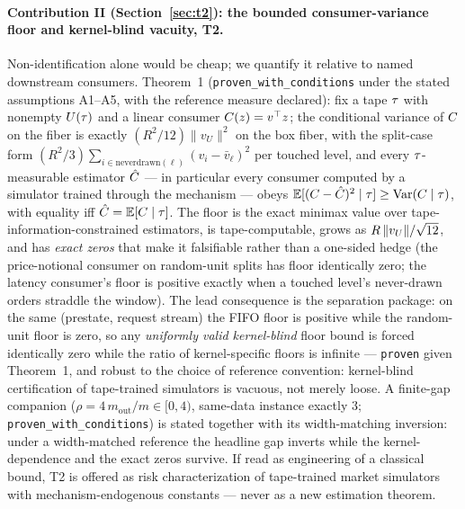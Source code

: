 \paragraph{Contribution II (Section~\ref{sec:t2}): the bounded
consumer-variance floor and kernel-blind vacuity, T2.}
Non-identification alone would be cheap; we quantify it relative to named
downstream consumers. Theorem~1 (\texttt{proven\_with\_conditions} under the
stated assumptions A1--A5, with the reference measure declared): fix a tape
$\tau$ with nonempty $U(\tau)$ and a linear consumer $C(z) = v^{\top} z$;
the conditional variance of $C$ on the fiber is exactly
$(R^{2}/12)\lVert v_{U}\rVert^{2}$ on the box fiber, with the split-case form
$(R^{2}/3)\sum_{i \in \mathrm{neverdrawn}(\ell)}(v_i - \bar{v}_\ell)^{2}$
per touched level, and every $\tau$-measurable estimator
$\hat{C}$ --- in particular every consumer computed by a simulator
trained through the mechanism --- obeys
$\mathbb{E}[(C - \hat{C})^{2} \mid \tau] \ge
\mathrm{Var}(C \mid \tau)$, with equality iff
$\hat{C} = \mathbb{E}[C \mid \tau]$. The floor is the exact
minimax value over tape-information-constrained estimators, is
tape-computable, grows as $R\,\lVert v_{U}\rVert/\sqrt{12}$, and has \emph{exact zeros} that make
it falsifiable rather than a one-sided hedge (the price-notional consumer on
random-unit splits has floor identically zero; the latency consumer's floor
is positive exactly when a touched level's never-drawn orders straddle the
window). The lead consequence is the separation package: on the same
(prestate, request stream) the FIFO floor is positive while the random-unit
floor is zero, so any \emph{uniformly valid kernel-blind} floor bound is
forced identically zero while the ratio of kernel-specific floors is
infinite --- \texttt{proven} given Theorem~1, and robust to the choice of
reference convention: kernel-blind certification of tape-trained simulators
is vacuous, not merely loose. A finite-gap companion
($\rho = 4\,m_{\mathrm{out}}/m \in [0,4)$, same-data instance exactly $3$;
\texttt{proven\_with\_conditions}) is stated together with its
width-matching inversion: under a width-matched reference the headline gap
inverts while the kernel-dependence and the exact zeros survive. If read as
engineering of a classical bound, T2 is offered as risk characterization of
tape-trained market simulators with mechanism-endogenous constants --- never
as a new estimation theorem.


